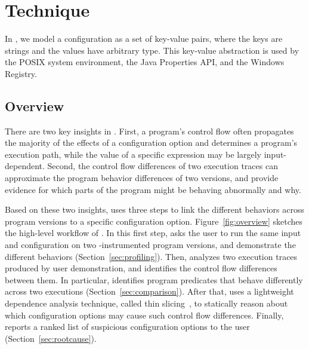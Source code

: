 
\section{Technique}
\label{sec:technique}

In \ourtool, we model a configuration as a set of key-value
pairs, where the keys are strings and the values have
arbitrary type. 
This key-value abstraction
is used by the POSIX system environment, the Java
Properties API, and the Windows Registry.


\subsection{Overview}

There are two key insights in \ourtool. First,
a program's control flow often propagates the majority of
the effects of a configuration option and determines
a program's execution path, while the value of a
specific expression may be largely input-dependent.
Second, the control flow differences of two execution
traces can approximate the program behavior differences
of two versions, and provide evidence
for which parts of the program might be behaving
abnormally and why.

Based on these two insights, \ourtool uses three
steps to link the different behaviors across program
versions to a specific configuration option.
Figure~\ref{fig:overview} sketches the high-level workflow of
\ourtool. 
In this first step, \ourtool asks the
user to run the same input and
configuration on two \ourtool-instrumented program versions,
and demonstrate the different behaviors (Section~\ref{sec:profiling}).
Then, \ourtool analyzes two execution traces produced
by user demonstration, and identifies the control flow differences between
them. In particular, \ourtool identifies program predicates
that behave differently across two executions
(Section~\ref{sec:comparison}).
After that, \ourtool uses a lightweight dependence
analysis technique, called thin slicing~\cite{Sridharan:2007},
to statically reason about which configuration
options may cause such control flow differences.
Finally, \ourtool reports a ranked list of 
suspicious configuration options to the user (Section~\ref{sec:rootcause}).

